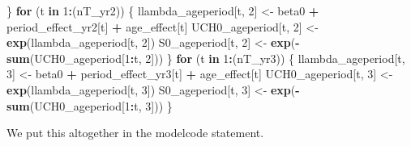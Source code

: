 \documentclass[11pt,]{article}
\newenvironment{Shaded}{\begin{snugshade}}{\end{snugshade}}
\newcommand{\KeywordTok}[1]{\textcolor[rgb]{0.13,0.29,0.53}{\textbf{#1}}}
\newcommand{\DecValTok}[1]{\textcolor[rgb]{0.00,0.00,0.81}{#1}}
\newcommand{\StringTok}[1]{\textcolor[rgb]{0.31,0.60,0.02}{#1}}
\newcommand{\ControlFlowTok}[1]{\textcolor[rgb]{0.13,0.29,0.53}{\textbf{#1}}}
\newcommand{\OperatorTok}[1]{\textcolor[rgb]{0.81,0.36,0.00}{\textbf{#1}}}
\newcommand{\NormalTok}[1]{#1}
\begin{document}
\begin{Shaded}
\begin{Highlighting}[]
\NormalTok{  \}}
  \ControlFlowTok{for}\NormalTok{ (t }\ControlFlowTok{in} \DecValTok{1}\OperatorTok{:}\NormalTok{(nT_yr2)) \{}
\NormalTok{    llambda_ageperiod[t, }\DecValTok{2}\NormalTok{] <-}\StringTok{ }\NormalTok{beta0 }\OperatorTok{+}\StringTok{ }\NormalTok{period_effect_yr2[t] }\OperatorTok{+}\StringTok{ }\NormalTok{age_effect[t]}
\NormalTok{    UCH0_ageperiod[t, }\DecValTok{2}\NormalTok{] <-}\StringTok{ }\KeywordTok{exp}\NormalTok{(llambda_ageperiod[t, }\DecValTok{2}\NormalTok{])}
\NormalTok{    S0_ageperiod[t, }\DecValTok{2}\NormalTok{] <-}\StringTok{ }\KeywordTok{exp}\NormalTok{(}\OperatorTok{-}\KeywordTok{sum}\NormalTok{(UCH0_ageperiod[}\DecValTok{1}\OperatorTok{:}\NormalTok{t, }\DecValTok{2}\NormalTok{]))}
\NormalTok{  \}}
  \ControlFlowTok{for}\NormalTok{ (t }\ControlFlowTok{in} \DecValTok{1}\OperatorTok{:}\NormalTok{(nT_yr3)) \{}
\NormalTok{    llambda_ageperiod[t, }\DecValTok{3}\NormalTok{] <-}\StringTok{ }\NormalTok{beta0 }\OperatorTok{+}\StringTok{ }\NormalTok{period_effect_yr3[t] }\OperatorTok{+}\StringTok{ }\NormalTok{age_effect[t]}
\NormalTok{    UCH0_ageperiod[t, }\DecValTok{3}\NormalTok{] <-}\StringTok{ }\KeywordTok{exp}\NormalTok{(llambda_ageperiod[t, }\DecValTok{3}\NormalTok{])}
\NormalTok{    S0_ageperiod[t, }\DecValTok{3}\NormalTok{] <-}\StringTok{ }\KeywordTok{exp}\NormalTok{(}\OperatorTok{-}\KeywordTok{sum}\NormalTok{(UCH0_ageperiod[}\DecValTok{1}\OperatorTok{:}\NormalTok{t, }\DecValTok{3}\NormalTok{]))}
\NormalTok{  \}}
\end{Highlighting}
\end{Shaded}

We put this altogether in the modelcode statement.
\end{document}
